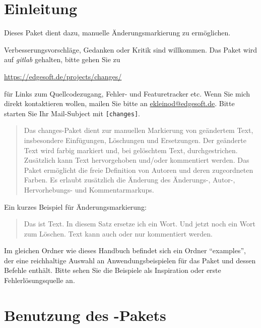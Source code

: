 \section{Einleitung}

Dieses Paket dient dazu, manuelle Änderungsmarkierung zu ermöglichen.

Verbesserungsvorschläge, Gedanken oder Kritik sind willkommen.
Das Paket wird auf \emph{gitlab} gehalten, bitte gehen Sie zu

\url{https://edgesoft.de/projects/changes/}

für Links zum Quellcodezugang, Fehler- und Featuretracker etc.
Wenn Sie mich direkt kontaktieren wollen, mailen Sie bitte an \href{mailto:ekleinod@edgesoft.de}{ekleinod@edgesoft.de}.
Bitte starten Sie Ihr Mail-Subject mit \texttt{[changes]}.

\begin{quote}
	Das changes-Paket dient zur manuellen Markierung von geändertem Text, insbesondere Einfügungen, Löschungen und Ersetzungen.
	Der geänderte Text wird farbig markiert und, bei gelöschtem Text, durchgestrichen.
	Zusätzlich kann Text hervorgehoben und/oder kommentiert werden.
	Das Paket ermöglicht die freie Definition von Autoren und deren zugeordneten Farben.
	Es erlaubt zusätzlich die Änderung des Änderungs-, Autor-, Hervorhebungs- und Kommentarmarkups.
\end{quote}

Ein kurzes Beispiel für Änderungsmarkierung:

\begin{quote}
	Das ist  Text.
	In diesem Satz ersetze ich ein  Wort.
	Und jetzt noch ein  Wort zum Löschen.
	Text kann auch  oder nur  kommentiert werden.
\end{quote}

Im gleichen Ordner wie dieses Handbuch befindet sich ein Ordner "`examples"', der eine reichhaltige Auswahl an Anwendungsbeispielen für das Paket und dessen Befehle enthält.
Bitte sehen Sie die Beispiele als Inspiration oder erste Fehlerlösungsquelle an.


\cleardoublepage
\section{Benutzung des -Pakets}
\label{sec:usage}

